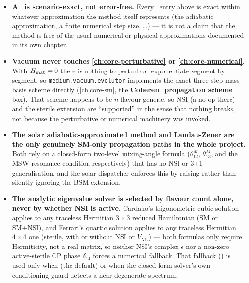 \begin{notebox}[title={Reading This Table}]
\begin{itemize}
  \item \textbf{A \checkmark\ is scenario-exact, not error-free.} Every
    \checkmark\ entry above is exact within whatever approximation the
    method itself represents (the adiabatic approximation, a finite
    numerical step size, \dots) --- it is not a claim that the method is
    free of the usual numerical or physical approximations documented in
    its own chapter.
  \item \textbf{Vacuum never touches \cref{ch:core-perturbative} or
    \cref{ch:core-numerical}.} With $H_{\rm mat}=0$ there is nothing to
    perturb or exponentiate segment by segment, so
    \texttt{medium.vacuum.evolutor} implements the exact three-step
    mass-basis scheme directly (\cref{ch:core-sm}, the \textbf{Coherent
    propagation scheme} box). That scheme happens to be $n$-flavour
    generic, so NSI (a no-op there) and the sterile extension are
    ``supported'' in the sense that nothing breaks, not because the
    perturbative or numerical machinery was invoked.
  \item \textbf{The solar adiabatic-approximated method and Landau-Zener are
    the only genuinely SM-only propagation paths in the whole project.}
    Both rely on a closed-form two-level mixing-angle formula
    ($\theta_{12}^M$, $\theta_{13}^M$, and the MSW resonance condition
    respectively) that has no NSI or 3+1 generalisation, and the solar
    dispatcher enforces this by raising rather than silently ignoring the
    BSM extension.
  \item \textbf{The analytic eigenvalue solver is selected by flavour count
    alone, never by whether NSI is active.} Cardano's trigonometric cubic
    solution applies to any traceless Hermitian $3\times3$ reduced
    Hamiltonian (SM or SM+NSI), and Ferrari's quartic solution applies to
    any traceless Hermitian $4\times4$ one (sterile, with or without NSI or
    $V_{NC}$) --- both formulas only require Hermiticity, not a real
    matrix, so neither NSI's complex $\epsilon$ nor a non-zero
    active-sterile CP phase $\delta_{14}$ forces a numerical fallback. That
    fallback () is used only when
     (the default) or when the
    closed-form solver's own conditioning guard detects a near-degenerate
    spectrum.
\end{itemize}
\end{notebox}
